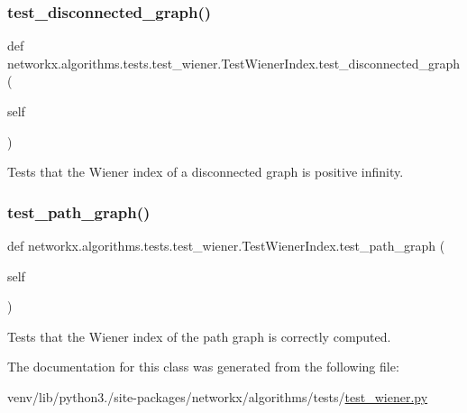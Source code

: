 \subsubsection{\texorpdfstring{test\+\_\+disconnected\+\_\+graph()}{test\_disconnected\_graph()}}
{\footnotesize\ttfamily def networkx.\+algorithms.\+tests.\+test\+\_\+wiener.\+Test\+Wiener\+Index.\+test\+\_\+disconnected\+\_\+graph (\begin{DoxyParamCaption}\item[{}]{self }\end{DoxyParamCaption})}

\begin{DoxyVerb}Tests that the Wiener index of a disconnected graph is
positive infinity.\end{DoxyVerb}
 \mbox{\label{classnetworkx_1_1algorithms_1_1tests_1_1test__wiener_1_1TestWienerIndex_aa2ad865a5f1b7fad15342aa87a61dd63}} 
\subsubsection{\texorpdfstring{test\+\_\+path\+\_\+graph()}{test\_path\_graph()}}
{\footnotesize\ttfamily def networkx.\+algorithms.\+tests.\+test\+\_\+wiener.\+Test\+Wiener\+Index.\+test\+\_\+path\+\_\+graph (\begin{DoxyParamCaption}\item[{}]{self }\end{DoxyParamCaption})}

\begin{DoxyVerb}Tests that the Wiener index of the path graph is correctly
computed.\end{DoxyVerb}
 

The documentation for this class was generated from the following file\+:\begin{DoxyCompactItemize}
\item 
venv/lib/python3./site-\/packages/networkx/algorithms/tests/\hyperlink{test__wiener_8py}{test\+\_\+wiener.\+py}\end{DoxyCompactItemize}

